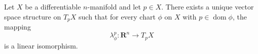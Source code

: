 Let $X$ be a differentiable $n$-manifold and let $p \in X$. There exists a unique vector space structure on $T_p X$ such that for every chart $\phi$ on $X$ with $p \in \operatorname{dom} \phi$, the mapping
$$
\lambda_\phi^p \colon \mathbf{R}^n \to T_p X
$$
is a linear isomorphism.

